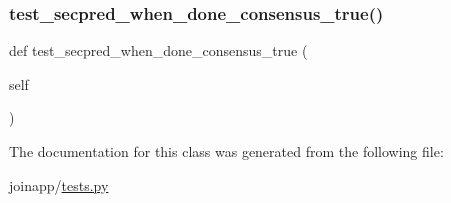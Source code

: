 \subsubsection{\texorpdfstring{test\_secpred\_when\_done\_consensus\_true()}{test\_secpred\_when\_done\_consensus\_true()}}
{\footnotesize\ttfamily def test\+\_\+secpred\+\_\+when\+\_\+done\+\_\+consensus\+\_\+true (\begin{DoxyParamCaption}\item[{}]{self }\end{DoxyParamCaption})}



The documentation for this class was generated from the following file\+:\begin{DoxyCompactItemize}
\item 
joinapp/\mbox{\hyperlink{tests_8py}{tests.\+py}}\end{DoxyCompactItemize}
